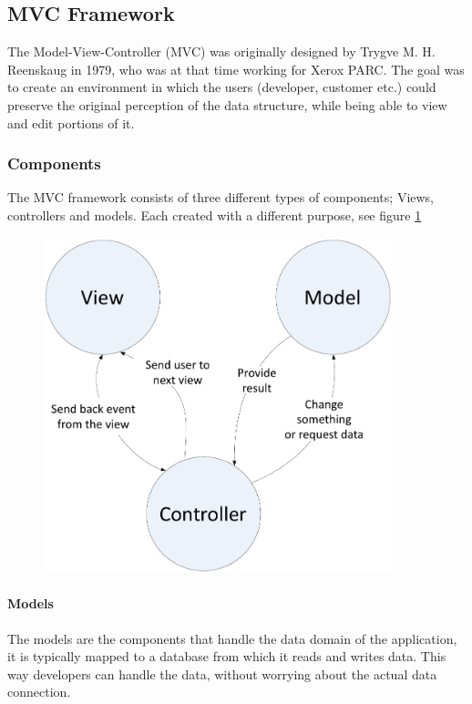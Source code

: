 \subsection{MVC Framework}
\label{sec:mvc}
The Model-View-Controller (MVC) was originally designed by Trygve M. H. Reenskaug in 1979, who was at that time working for Xerox PARC. The goal was to create an environment in which the users (developer, customer etc.) could preserve the original perception of the data structure, while being able to view and edit portions of it. \cite{mvcxeroxparc}

\subsubsection{Components}

The MVC framework consists of three different types of components; Views, controllers and models. Each created with a different purpose, see figure \ref{fig:mvc-drawing}

\begin{figure}[htb]
	\centering
		\includegraphics[width=0.90\textwidth]{input/implementation/mvc/mvc.pdf}
	\label{fig:mvc-drawing}
\end{figure}



\paragraph{Models}
The models are the components that handle the data domain of the application, it is typically mapped to a database from which it reads and writes data. This way developers can handle the data, without worrying about the actual data connection.

